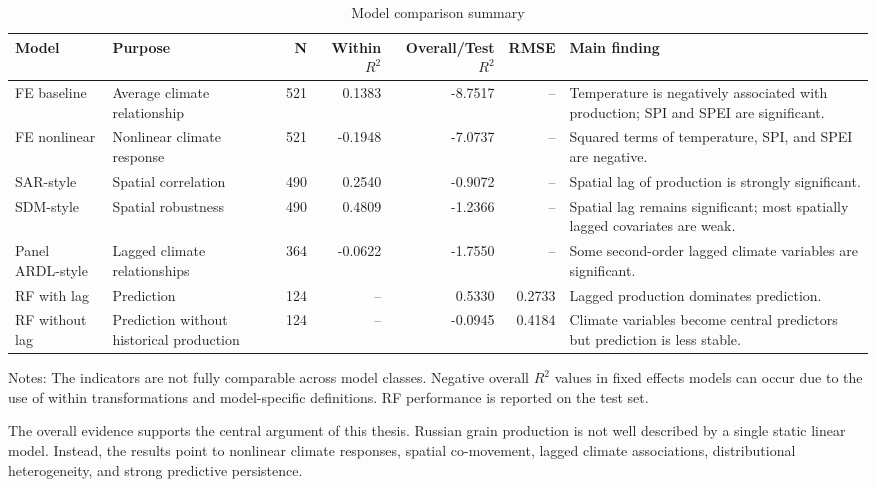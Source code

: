\documentclass[12pt,a4paper]{article}
\begin{document}
\begin{table}[H]
\centering
\caption{Model comparison summary}
\label{tab:model_compare}
\begin{threeparttable}
\begin{adjustbox}{width=\textwidth}
\begin{tabular}{p{3.0cm}p{4.4cm}rrrrp{4.2cm}}
\toprule
Model & Purpose & N & Within \(R^2\) & Overall/Test \(R^2\) & RMSE & Main finding \\
\midrule
FE baseline & Average climate relationship & 521 & 0.1383 & -8.7517 & -- & Temperature is negatively associated with production; SPI and SPEI are significant. \\
FE nonlinear & Nonlinear climate response & 521 & -0.1948 & -7.0737 & -- & Squared terms of temperature, SPI, and SPEI are negative. \\
SAR-style & Spatial correlation & 490 & 0.2540 & -0.9072 & -- & Spatial lag of production is strongly significant. \\
SDM-style & Spatial robustness & 490 & 0.4809 & -1.2366 & -- & Spatial lag remains significant; most spatially lagged covariates are weak. \\
Panel ARDL-style & Lagged climate relationships & 364 & -0.0622 & -1.7550 & -- & Some second-order lagged climate variables are significant. \\
RF with lag & Prediction & 124 & -- & 0.5330 & 0.2733 & Lagged production dominates prediction. \\
RF without lag & Prediction without historical production & 124 & -- & -0.0945 & 0.4184 & Climate variables become central predictors but prediction is less stable. \\
\bottomrule
\end{tabular}
\end{adjustbox}
\begin{tablenotes}
\small
\item Notes: The indicators are not fully comparable across model classes. Negative overall \(R^2\) values in fixed effects models can occur due to the use of within transformations and model-specific definitions. RF performance is reported on the test set.
\end{tablenotes}
\end{threeparttable}
\end{table}

The overall evidence supports the central argument of this thesis. Russian grain production is not well described by a single static linear model. Instead, the results point to nonlinear climate responses, spatial co-movement, lagged climate associations, distributional heterogeneity, and strong predictive persistence.
\end{document}
